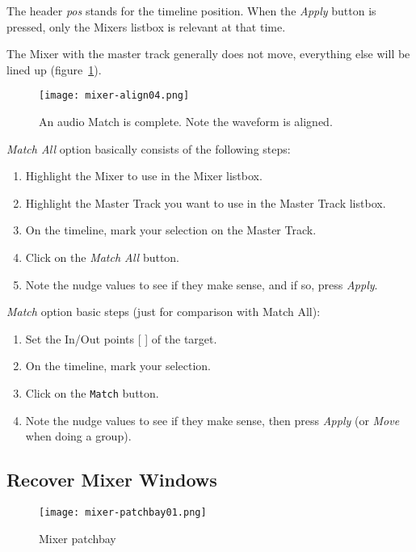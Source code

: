 The header \textit{pos} stands for the timeline position. When the \textit{Apply} button is pressed, only the Mixers listbox is relevant at that time.

The Mixer with the master track generally does not move, everything else will be lined up (figure~\ref{fig:mixer-align04}).

\begin{figure}[htpb]
    \centering
    \texttt{[image: mixer-align04.png]}
    \caption{An audio Match is complete. Note the waveform is aligned.}
    \label{fig:mixer-align04}
\end{figure}

\textit{Match All} option basically consists of the following steps:

\begin{enumerate}
    \item Highlight the Mixer to use in the Mixer listbox.
    \item Highlight the Master Track you want to use in the Master Track listbox.
    \item On the timeline, mark your selection on the Master Track.
    \item Click on the \textit{Match All} button.
    \item Note the nudge values to see if they make sense, and if so, press \textit{Apply}.
\end{enumerate}

\textit{Match} option basic steps (just for comparison with Match All):

\begin{enumerate}
    \item Set the In/Out points [ ] of the target.
    \item On the timeline, mark your selection.
    \item Click on the \texttt{Match} button.
    \item Note the nudge values to see if they make sense, then press \textit{Apply} (or \textit{Move} when doing a group).
\end{enumerate}

\subsection{Recover Mixer Windows}%
\label{sub:recover_mixer_windows}

\begin{wrapfigure}[16]{O}{1em + 0.3\textwidth} 
    \vspace{-1ex}
    \centering
    \texttt{[image: mixer-patchbay01.png]}
    \caption{Mixer  patchbay}
    \label{fig:mixer-patchbay01}
\end{wrapfigure} 

